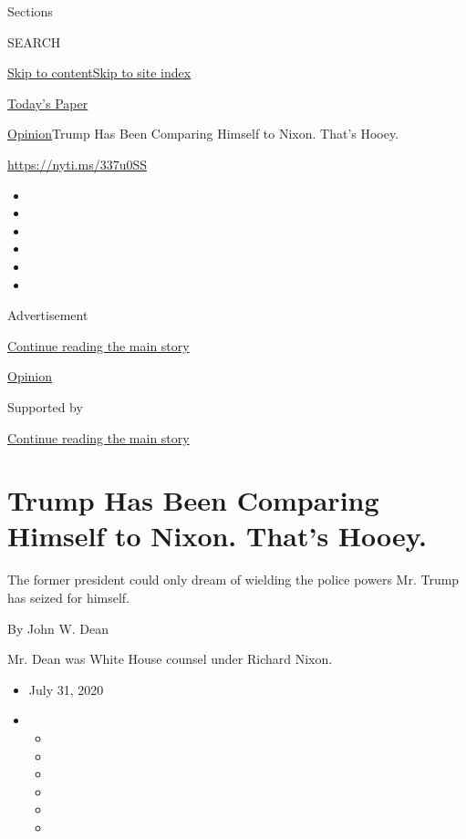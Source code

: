Sections

SEARCH

\protect\hyperlink{site-content}{Skip to
content}\protect\hyperlink{site-index}{Skip to site index}

\href{https://myaccount.nytimes.com/auth/login?response_type=cookie\&client_id=vi}{}

\href{https://www.nytimes.com/section/todayspaper}{Today's Paper}

\href{/section/opinion}{Opinion}\textbar{}Trump Has Been Comparing
Himself to Nixon. That's Hooey.

\url{https://nyti.ms/337u0SS}

\begin{itemize}
\item
\item
\item
\item
\item
\item
\end{itemize}

Advertisement

\protect\hyperlink{after-top}{Continue reading the main story}

\href{/section/opinion}{Opinion}

Supported by

\protect\hyperlink{after-sponsor}{Continue reading the main story}

\hypertarget{trump-has-been-comparing-himself-to-nixon-thats-hooey}{%
\section{Trump Has Been Comparing Himself to Nixon. That's
Hooey.}\label{trump-has-been-comparing-himself-to-nixon-thats-hooey}}

The former president could only dream of wielding the police powers Mr.
Trump has seized for himself.

By John W. Dean

Mr. Dean was White House counsel under Richard Nixon.

\begin{itemize}
\item
  July 31, 2020
\item
  \begin{itemize}
  \item
  \item
  \item
  \item
  \item
  \item
  \end{itemize}
\end{itemize}

